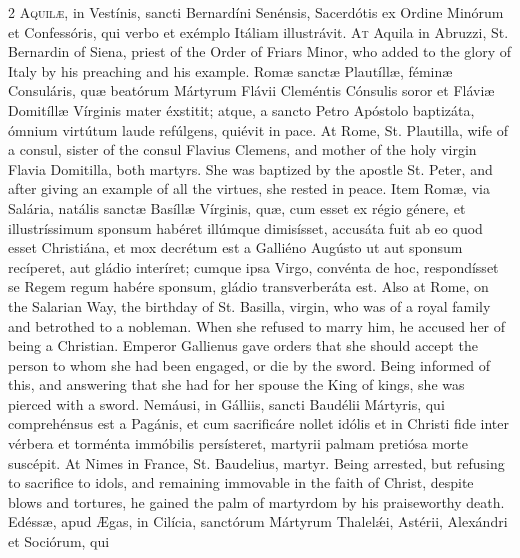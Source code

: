 \begin{paracol}{2}
\lettrine[lines=2]{A}{quilæ,} in Vestínis, 
 sancti Bernardíni Senénsis, Sacerdótis ex Ordine Minórum et Confessóris, qui 
 verbo et exémplo Itáliam illustrávit.
\switchcolumn
{}
\lettrine[lines=2]{A}{t} Aquila in Abruzzi, St. Bernardin 
 of Siena, priest of the Order of Friars Minor, who added to the glory of 
 Italy by his preaching and his example.
\switchcolumn*
{}
Romæ sanctæ Plautíllæ, 
 féminæ Consuláris, quæ beatórum Mártyrum Flávii Cleméntis Cónsulis soror et 
 Fláviæ Domitíllæ Vírginis mater 
 éxstitit; atque, a sancto Petro Apóstolo 
 baptizáta, ómnium virtútum laude refúlgens, quiévit in pace.
\switchcolumn
{}
At Rome, St. Plautilla, wife of a 
 consul, sister of the consul Flavius Clemens, and mother of the holy virgin 
 Flavia Domitilla, both martyrs. She was baptized by the apostle St. 
 Peter, and after giving an example of all the virtues, she rested in peace.
\switchcolumn*
{}
Item Romæ, via Salária, 
 natális sanctæ Basíllæ Vírginis, quæ, cum esset ex régio génere, et 
 illustríssimum sponsum habéret illúmque dimisísset, accusáta fuit ab eo quod 
 esset Christiána, et mox decrétum est a Galliéno Augústo ut aut sponsum 
 recíperet, aut gládio interíret; cumque ipsa Virgo, convénta de hoc, 
 respondísset se Regem regum habére sponsum, gládio transverberáta est.
\switchcolumn
{}
Also at Rome, on the Salarian Way, 
 the birthday of St. Basilla, virgin, who was of a royal family and betrothed 
 to a nobleman. When she refused to marry him, he accused her of being 
 a Christian. Emperor Gallienus gave orders that she should accept the 
 person to whom she had been engaged, or die by the sword. Being 
 informed of this, and answering that she had for her spouse the King of 
 kings, she was pierced with a sword.
\switchcolumn*
{}
Nemáusi, in Gálliis, 
 sancti Baudélii Mártyris, qui comprehénsus est a Pagánis, et cum sacrificáre 
 nollet idólis et in Christi fide inter vérbera et torménta immóbilis 
 persísteret, martyrii palmam pretiósa morte suscépit.
\switchcolumn
{}
At Nimes in France, St. Baudelius, 
 martyr. Being arrested, but refusing to sacrifice to idols, and 
 remaining immovable in the faith of Christ, despite blows and tortures, he 
 gained the palm of martyrdom by his praiseworthy death.
\switchcolumn*
{}
Edéssæ, apud Ægas, in 
 Cilícia, sanctórum Mártyrum Thalelǽi, Astérii, Alexándri et Sociórum, qui 

\end{paracol}
